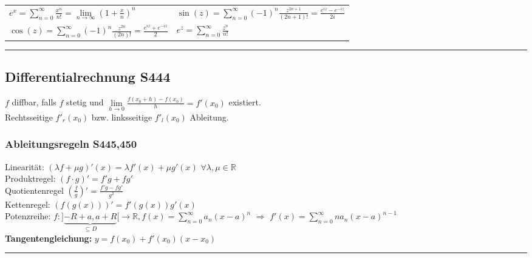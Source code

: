 \documentclass[6pt,a4paper]{scrartcl}
\newcommand{\enbrace}[1]{\ensuremath{\left(#1\right)}}
\begin{document}
\begin{multicols*}{2}
\begin{multicols}{2}
\begin{tabulary}{7cm}{L|L}
	
	$	e^x = \sum_{n = 0}^{\infty} \frac{x^n}{n!} = \lim\limits_{n\to\infty}\enbrace{1+\frac{x}{n}}^n$ &
	$\sin (z) = \sum_{n = 0}^{\infty} (-1)^n \frac{z^{2n +1}}{(2n +1)!} = \frac{e^{iz} - e^{-iz}}{2i}$  \\
	 $ \cos (z) = \sum_{n = 0}^{\infty} (-1)^n \frac{z^{2n}}{(2n)!} = \frac{e^{iz} + e^{-iz}}{2}$&$	e^z = \sum_{n = 0}^{\infty} \frac{z^n}{n!}$ \\
\end{tabulary}

\end{multicols}
\hrule
\subsection{Differentialrechnung \color{red}S444}
$f$ diffbar, falls $f$ stetig und $\underset{h\rightarrow 0}{\lim}\frac{f(x_0+h)-f(x_0)}{h}=f'(x_0)$ existiert.\\
Rechtsseitige $f'_{r}(x_{0})$ bzw. linksseitige $f'_{l}(x_{0})$ Ableitung.\\

\subsubsection{Ableitungsregeln \color{red}S445,450}
Linearität: $(\lambda f + \mu g)' (x) = \lambda f'(x) + \mu g'(x)$ \quad $\forall \lambda, \mu \in \mathbb R$ \\
Produktregel: $(f \cdot g)' = f' g + f g'$\\
Quotientenregel $\enbrace{\frac{f}{g}}' = \frac{f'g - fg'}{g^2}$\\
Kettenregel: $\left( f(g(x)) \right)' = f'(g(x)) g'(x)$\\
Potenzreihe: $f: ] \underbrace{-R+a, a+R}_{\subseteq D}	 [ \rightarrow \mathbb R, f(x) = \sum_{n=0}^{\infty} a_n (x -a)^n$ \quad $\Rightarrow$ \quad $f'(x) = \sum_{n=0}^{\infty} n a_{n} (x-a)^{n-1}$\\
\textbf{Tangentengleichung:} $y=f(x_0)+f'(x_0)(x-x_0)$
\hrule

\end{multicols*}
\end{document}
